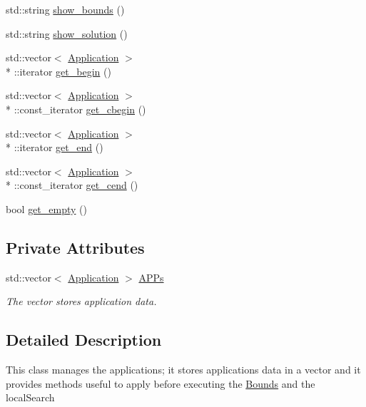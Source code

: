 \begin{DoxyCompactItemize}
\item 
std\-::string \hyperlink{classBatch_a6e3c7278556780b9fb1e530c740b41de}{show\-\_\-bounds} ()
\item 
std\-::string \hyperlink{classBatch_a54f580f3d93657bdf72420d338551087}{show\-\_\-solution} ()
\item 
std\-::vector$<$ \hyperlink{classApplication}{Application} $>$\\*
\-::iterator \hyperlink{classBatch_a2e6d4bba1cc89e2ecb55e3aca7228046}{get\-\_\-begin} ()
\item 
std\-::vector$<$ \hyperlink{classApplication}{Application} $>$\\*
\-::const\-\_\-iterator \hyperlink{classBatch_af6cccfc68c9a29acc008b5f316dc3abc}{get\-\_\-cbegin} ()
\item 
std\-::vector$<$ \hyperlink{classApplication}{Application} $>$\\*
\-::iterator \hyperlink{classBatch_a5585c86c7f6545178d0b0e0a82d93fa3}{get\-\_\-end} ()
\item 
std\-::vector$<$ \hyperlink{classApplication}{Application} $>$\\*
\-::const\-\_\-iterator \hyperlink{classBatch_a69e1aff3a876d8e96989b94ad5f2e311}{get\-\_\-cend} ()
\item 
bool \hyperlink{classBatch_a8bbd81b72e695e1fc2c1a1687d72e71a}{get\-\_\-empty} ()
\end{DoxyCompactItemize}
\subsection*{Private Attributes}
\begin{DoxyCompactItemize}
\item 
std\-::vector$<$ \hyperlink{classApplication}{Application} $>$ \hyperlink{classBatch_a757bf1a36fee46b1b47263ab4a59c560}{A\-P\-Ps}
\begin{DoxyCompactList}\small\item\em The vector stores application data. \end{DoxyCompactList}\end{DoxyCompactItemize}


\subsection{Detailed Description}
This class manages the applications; it stores applications data in a vector and it provides methods useful to apply before executing the \hyperlink{classBounds}{Bounds} and the local\-Search 

